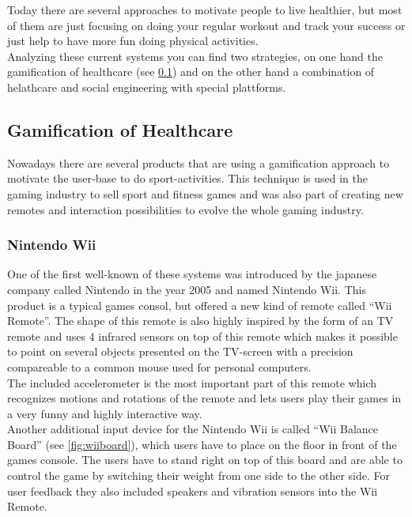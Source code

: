 \documentclass[a4paper,11pt]{article}
\begin{document}
Today there are several approaches to motivate people to live healthier, but most of them are just focusing on doing your regular workout and track your success or just help to have more fun doing physical activities. \\

Analyzing these current systems you can find two strategies, on one hand the gamification of healthcare (see \ref{sect:star:gamification}) and on the other hand a combination of helathcare and social engineering with special plattforms.


\subsection{Gamification of Healthcare}
\label{sect:star:gamification}
Nowadays there are several products that are using a gamification approach to motivate the user-base to do sport-activities. This technique is used in the gaming industry to sell sport and fitness games and was also part of creating new remotes and interaction possibilities to evolve the whole gaming industry.

\subsubsection{Nintendo Wii}
\label{sect:star:wii}
One of the first well-known of these systems was introduced by the japanese company called Nintendo in the year 2005 and named Nintendo Wii. This product is a typical games consol, but offered a new kind of remote called ``Wii Remote''. The shape of this remote is also highly inspired by the form of an TV remote and uses 4 infrared sensors on top of this remote which makes it possible to point on several objects presented on the TV-screen with a precision compareable to a common mouse used for personal computers. \\

The included accelerometer is the most important part of this remote which recognizes motions and rotations of the remote and lets users play their games in a very funny and highly interactive way. \\

Another additional input device for the Nintendo Wii is called ``Wii Balance Board'' (see \ref{fig:wiiboard}), which users have to place on the floor in front of the games console. The users have to stand right on top of this board and are able to control the game by switching their weight from one side to the other side.
For user feedback they also included speakers and vibration sensors into the Wii Remote. \\
\end{document}
